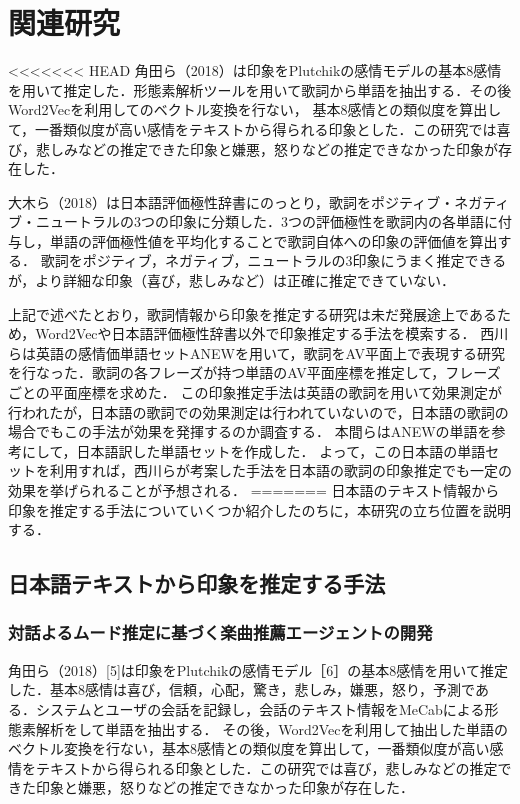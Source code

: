\documentclass[a4paper,10pt,twocolumn]{jsarticle}
\begin{document}
\section{関連研究}
<<<<<<< HEAD
角田ら（2018）\cite{4}は印象をPlutchikの感情モデルの基本8感情\cite{5}を用いて推定した．形態素解析ツールを用いて歌詞から単語を抽出する．その後Word2Vecを利用してのベクトル変換を行ない，
基本8感情との類似度を算出して，一番類似度が高い感情をテキストから得られる印象とした．この研究では喜び，悲しみなどの推定できた印象と嫌悪，怒りなどの推定できなかった印象が存在した．

大木ら（2018）\cite{6}は日本語評価極性辞書にのっとり，歌詞をポジティブ・ネガティブ・ニュートラルの3つの印象に分類した．3つの評価極性を歌詞内の各単語に付与し，単語の評価極性値を平均化することで歌詞自体への印象の評価値を算出する．
歌詞をポジティブ，ネガティブ，ニュートラルの3印象にうまく推定できるが，より詳細な印象（喜び，悲しみなど）は正確に推定できていない．

上記で述べたとおり，歌詞情報から印象を推定する研究は未だ発展途上であるため，Word2Vecや日本語評価極性辞書以外で印象推定する手法を模索する．
西川らは英語の感情価単語セットANEW\cite{7}を用いて，歌詞をAV平面上で表現する研究を行なった．歌詞の各フレーズが持つ単語のAV平面座標を推定して，フレーズごとの平面座標を求めた．
この印象推定手法は英語の歌詞を用いて効果測定が行われたが，日本語の歌詞での効果測定は行われていないので，日本語の歌詞の場合でもこの手法が効果を発揮するのか調査する．
本間ら\cite{8}はANEWの単語を参考にして，日本語訳した単語セットを作成した．
よって，この日本語の単語セットを利用すれば，西川らが考案した手法を日本語の歌詞の印象推定でも一定の効果を挙げられることが予想される．
=======
日本語のテキスト情報から印象を推定する手法についていくつか紹介したのちに，本研究の立ち位置を説明する．

\subsection{日本語テキストから印象を推定する手法}
\subsubsection{対話よるムード推定に基づく楽曲推薦エージェントの開発}
角田ら（2018）[5]は印象をPlutchikの感情モデル［6］の基本8感情を用いて推定した．基本8感情は喜び，信頼，心配，驚き，悲しみ，嫌悪，怒り，予測である．システムとユーザの会話を記録し，会話のテキスト情報をMeCabによる形態素解析をして単語を抽出する．
その後，Word2Vecを利用して抽出した単語のベクトル変換を行ない，基本8感情との類似度を算出して，一番類似度が高い感情をテキストから得られる印象とした．この研究では喜び，悲しみなどの推定できた印象と嫌悪，怒りなどの推定できなかった印象が存在した．
\end{document}
